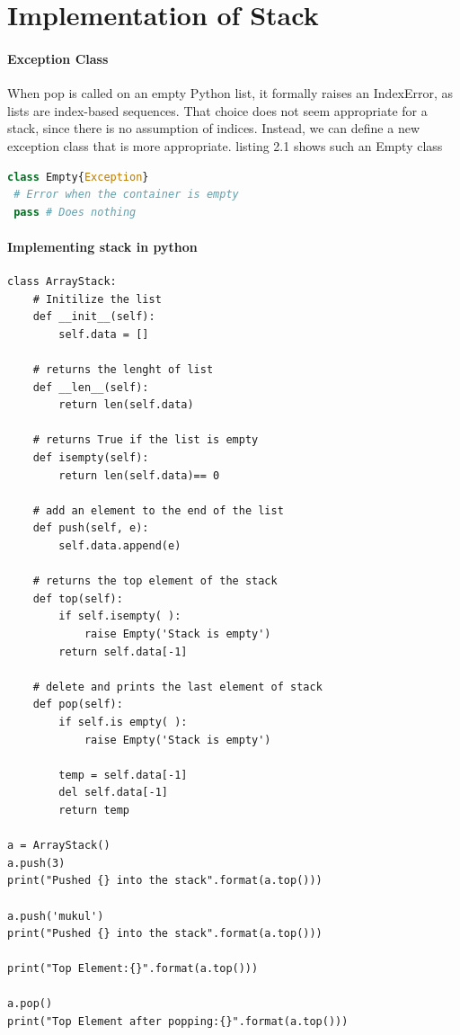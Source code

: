 \documentclass[a4paper,12pt]{report}
\begin{document}
\section{Implementation of Stack}
\paragraph{Exception Class}
When pop is called on an empty Python list, it formally raises an IndexError, as lists are index-based sequences. That choice does not seem appropriate for a stack, since
there is no assumption of indices. Instead, we can define a new exception class that
is more appropriate.
listing 2.1 shows such an Empty class
\begin{lstlisting}[language=python,caption=\textsf{Exception Class}]
class Empty{Exception}
 # Error when the container is empty
 pass # Does nothing
\end{lstlisting}
\newpage
\paragraph{Implementing stack in python}
\begin{lstlisting}[caption=\textsf{Implementation of Stack using List}]
class ArrayStack:
	# Initilize the list
	def __init__(self):
		self.data = []
	
	# returns the lenght of list
	def __len__(self):
		return len(self.data)

	# returns True if the list is empty
	def isempty(self):
		return len(self.data)== 0

	# add an element to the end of the list
	def push(self, e):
		self.data.append(e)

	# returns the top element of the stack
	def top(self):
		if self.isempty( ):
			raise Empty('Stack is empty')
		return self.data[-1] 
	
	# delete and prints the last element of stack
	def pop(self):
		if self.is empty( ):
			raise Empty('Stack is empty')
		
		temp = self.data[-1]
		del self.data[-1]
		return temp

a = ArrayStack()
a.push(3)
print("Pushed {} into the stack".format(a.top()))

a.push('mukul')
print("Pushed {} into the stack".format(a.top()))

print("Top Element:{}".format(a.top()))

a.pop()
print("Top Element after popping:{}".format(a.top()))
\end{lstlisting}
\end{document}
